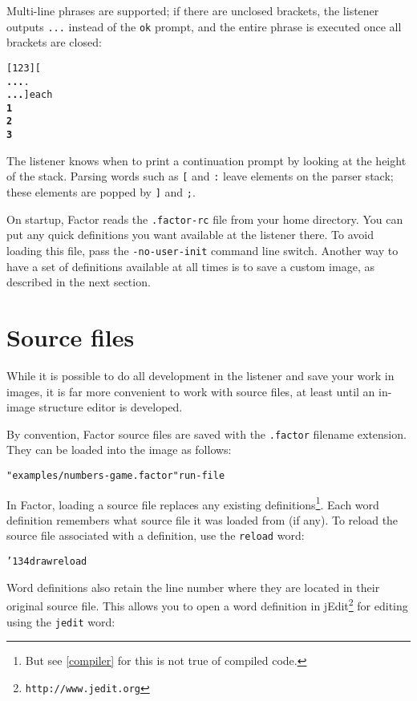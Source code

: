 \documentclass{book}
\newcommand{\bs}{\char'134}
\begin{document}
Multi-line phrases are supported; if there are unclosed brackets, the listener outputs \texttt{...} instead of the \texttt{ok} prompt, and the entire phrase is executed once all brackets are closed:

\begin{alltt}
  [ 1 2 3 ] [
\textbf{...} .
\textbf{...} ] each
\textbf{1
2
3}
\end{alltt}

The listener knows when to print a continuation prompt by looking at the height of the
stack. Parsing words such as \texttt{[} and \texttt{:} leave elements on the parser
stack; these elements are popped by \texttt{]} and \texttt{;}.

On startup, Factor reads the \texttt{.factor-rc} file from your home directory. You can put
any quick definitions you want available at the listener there. To avoid loading this
file, pass the \texttt{-no-user-init} command line switch. Another way to have a set of definitions available at all times is to save a custom image, as described in the next section.

\section{Source files}

While it is possible to do all development in the listener and save your work in images, it is far more convenient to work with source files, at least until an in-image structure editor is developed.

By convention, Factor source files are saved with the \texttt{.factor} filename extension. They can be loaded into the image as follows:

\begin{alltt}
  "examples/numbers-game.factor" run-file
\end{alltt}

In Factor, loading a source file replaces any existing definitions\footnote{But see \ref{compiler} for this is not true of compiled code.}. Each word definition remembers what source file it was loaded from (if any). To reload the source file associated with a definition, use the \texttt{reload} word:

\begin{alltt}
  \bs draw reload
\end{alltt}

Word definitions also retain the line number where they are located in their original source file. This allows you to open a word definition in jEdit\footnote{\texttt{http://www.jedit.org}} for editing using the
\texttt{jedit} word:
\end{document}
